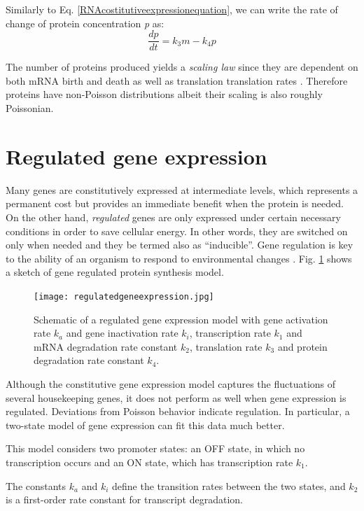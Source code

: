 \documentclass[12pt,a4paper]{report}
\begin{document}
Similarly to Eq. \ref{RNAcostitutiveexpressionequation}, we can write the rate of change of protein concentration \emph{p} as:
\begin{equation}\label{proteincostitutiveexpressionequation}
 \frac{dp}{dt} = k_{3}m - k_{4}p 
\end{equation}

The number of proteins produced yields a \emph{scaling law} since they are dependent on both mRNA birth and death as well as translation translation rates \cite{Article}. Therefore proteins have non-Poisson distributions albeit their scaling is also roughly Poissonian.

\section{Regulated gene expression}\label{regulatedgeneexpressionsection}
Many genes are constitutively expressed at intermediate levels, which represents a permanent cost but provides an immediate benefit when the protein is needed. On the other hand, \emph{regulated} genes are only expressed under certain necessary conditions in order to save cellular energy. In other words, they are switched on only when needed and they be termed also as ``inducible''. Gene regulation is key to the ability of an organism to respond to environmental changes \cite{generegulationNIH}. Fig. \ref{regulatedgeneexpression} shows a sketch of gene regulated protein synthesis model.

\begin{figure}[!ht]
\centering
\texttt{[image: regulatedgeneexpression.jpg]}
\caption{Schematic of a regulated gene expression model with gene activation rate $k_{a}$ and gene inactivation rate $k_{i}$, transcription rate $k_{1}$ and mRNA degradation rate constant $k_{2}$, translation rate $k_{3}$ and protein degradation rate constant $k_{4}$.}
\label{regulatedgeneexpression}
\end{figure}

Although the constitutive gene expression model captures the fluctuations of several housekeeping genes, it does not perform as well when gene expression is regulated. Deviations from Poisson behavior indicate regulation. In particular, a two-state model of gene expression can fit this data much better.

This model considers two promoter states: an OFF state, in which no transcription occurs and an ON state, which has transcription rate $k_{1}$. 

The constants $k_{a}$ and $k_{i}$ define the transition rates between the two states, and $k_{2}$ is a first-order rate constant for transcript degradation.
\end{document}
